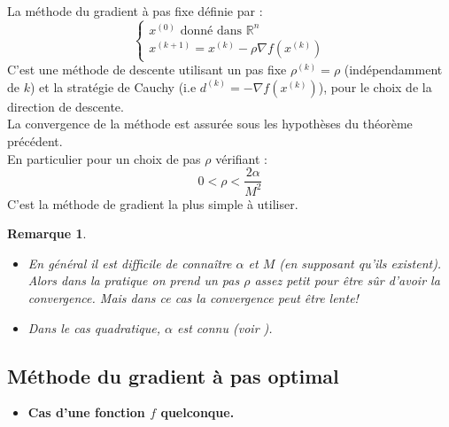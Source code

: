 \documentclass[12pt,a4paper,openay]{book}
\numberwithin{equation}{chapter}
\newtheorem{rmq}{Remarque}[chapter]
\newcommand{\R}{\mathbb{R}}
\begin{document}
		La m\'ethode du gradient \`a pas fixe d\'efinie par :
		$$\begin{cases}
		x^{(0)} \text{ donn\'e dans }\R^n\\
		x^{(k+1)} = x^{(k)} - \rho\nabla f\left(x^{(k)}\right)		
		\end{cases}
		$$ 		
		C'est une m\'ethode de descente utilisant un pas fixe $ \rho^{(k)} = \rho $ (ind\'ependamment de $k$) et la strat\'egie de Cauchy (i.e $d^{(k)} = -\nabla f\left(x^{(k)}\right)$), pour le choix de la direction de descente.\\				
		La convergence de la m\'ethode est assur\'ee sous les hypoth\`eses du th\'eor\`eme pr\'ec\'edent.\\		
		En particulier pour un choix de pas $\rho$ v\'erifiant :
		$$
		0 < \rho < \frac{2\alpha}{M^{2}}
		$$
		C'est la m\'ethode de gradient la plus simple \`a utiliser.
		\begin{rmq}
			\hfill
			\begin{itemize}
				\item[$\bullet$] En g\'en\'eral il est difficile de conna\^itre $\alpha$ et $M$ (en supposant qu'ils existent).				
				Alors dans la pratique on prend un pas $\rho$ assez petit pour \^etre sûr d'avoir la convergence. Mais dans ce cas la convergence peut \^etre lente!
				\item[$\bullet$] Dans le cas quadratique, $\alpha$ est connu (voir \cite[p.9]{f}).
			\end{itemize}
		\end{rmq}
	
	\subsection{M\'ethode du gradient \`a pas optimal}
	
	\begin{itemize}
		\item[$\bullet$] \textbf{\large Cas d'une fonction $f$ quelconque.} 
	\end{itemize}
\end{document}
